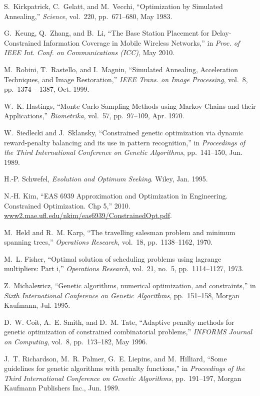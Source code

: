 \documentclass[draftcls,onecolumn]{IEEEtran}
\theoremstyle{plain}
\theoremstyle{definition}
\begin{document}
\begin{thebibliography}{10}
S.~Kirkpatrick, C.~Gelatt, and M.~Vecchi, ``{Optimization by Simulated
  Annealing},'' {\em Science}, vol.~220, pp.~671--680, May 1983.

G.~Keung, Q.~Zhang, and B.~Li, ``{The Base Station Placement for
  Delay-Constrained Information Coverage in Mobile Wireless Networks},'' in
  {\em {Proc. of IEEE Int. Conf. on Communications (ICC)}}, May 2010.

M.~Robini, T.~Rastello, and I.~Magnin, ``{Simulated Annealing, Acceleration
  Techniques, and Image Restoration},'' {\em {IEEE Trans. on Image
  Processing}}, vol.~8, pp.~1374 -- 1387, Oct. 1999.

W.~K. Hastings, ``{Monte Carlo Sampling Methods using Markov Chains and their
  Applications},'' {\em Biometrika}, vol.~57, pp.~97--109, Apr. 1970.

W.~Siedlecki and J.~Sklansky, ``Constrained genetic optimization via dynamic
  reward-penalty balancing and its use in pattern recognition,'' in {\em
  Proceedings of the Third International Conference on Genetic Algorithms},
  pp.~141--150, Jun. 1989.

H.-P. Schwefel, {\em Evolution and Optimum Seeking}.
\newblock Wiley, Jan. 1995.

N.-H. Kim, ``{EAS 6939 Approximation and Optimization in Engineering.
  Constrained Optimization. Chp 5},'' 2010.
\newblock \url{www2.mae.ufl.edu/nkim/eas6939/ConstrainedOpt.pdf}.

M.~Held and R.~M. Karp, ``The travelling salesman problem and minimum spanning
  trees,'' {\em Operations Research}, vol.~18, pp.~1138--1162, 1970.

M.~L. Fisher, ``Optimal solution of scheduling problems using lagrange
  multipliers: Part i,'' {\em Operations Research}, vol.~21, no.~5,
  pp.~1114--1127, 1973.

Z.~Michalewicz, ``Genetic algorithms, numerical optimization, and
  constraints,'' in {\em Sixth International Conference on Genetic Algorithms},
  pp.~151--158, Morgan Kaufmann, Jul. 1995.

D.~W. Coit, A.~E. Smith, and D.~M. Tate, ``Adaptive penalty methods for genetic
  optimization of constrained combinatorial problems,'' {\em INFORMS Journal on
  Computing}, vol.~8, pp.~173--182, May 1996.

J.~T. Richardson, M.~R. Palmer, G.~E. Liepins, and M.~Hilliard, ``Some
  guidelines for genetic algorithms with penalty functions,'' in {\em
  Proceedings of the Third International Conference on Genetic Algorithms},
  pp.~191--197, Morgan Kaufmann Publishers Inc., Jun. 1989.


\end{thebibliography}
\end{document}
